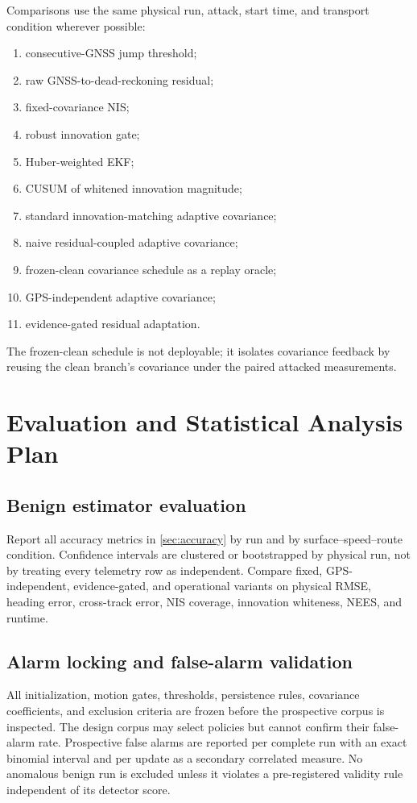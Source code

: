 \documentclass[11pt,a4paper]{article}
\begin{document}
Comparisons use the same physical run, attack, start time, and transport
condition wherever possible:
\begin{enumerate}
  \item consecutive-GNSS jump threshold;
  \item raw GNSS-to-dead-reckoning residual;
  \item fixed-covariance NIS;
  \item robust innovation gate;
  \item Huber-weighted EKF;
  \item CUSUM of whitened innovation magnitude;
  \item standard innovation-matching adaptive covariance;
  \item naive residual-coupled adaptive covariance;
  \item frozen-clean covariance schedule as a replay oracle;
  \item GPS-independent adaptive covariance;
  \item evidence-gated residual adaptation.
\end{enumerate}
The frozen-clean schedule is not deployable; it isolates covariance feedback by
reusing the clean branch's covariance under the paired attacked measurements.

\section{Evaluation and Statistical Analysis Plan}

\subsection{Benign estimator evaluation}

Report all accuracy metrics in \cref{sec:accuracy} by run and by
surface--speed--route condition. Confidence intervals are clustered or
bootstrapped by physical run, not by treating every telemetry row as
independent. Compare fixed, GPS-independent, evidence-gated, and operational
variants on physical RMSE, heading error, cross-track error, NIS coverage,
innovation whiteness, NEES, and runtime.

\subsection{Alarm locking and false-alarm validation}

All initialization, motion gates, thresholds, persistence rules, covariance
coefficients, and exclusion criteria are frozen before the prospective corpus
is inspected. The design corpus may select policies but cannot confirm their
false-alarm rate. Prospective false alarms are reported per complete run with
an exact binomial interval and per update as a secondary correlated measure.
No anomalous benign run is excluded unless it violates a pre-registered
validity rule independent of its detector score.
\end{document}
